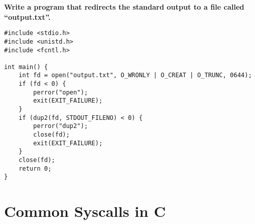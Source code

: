 \documentclass{article}
\begin{document}
\textbf{Write a program that redirects the standard output to a file called ``output.txt''.}

\begin{verbatim}
#include <stdio.h>
#include <unistd.h>
#include <fcntl.h>

int main() {
    int fd = open("output.txt", O_WRONLY | O_CREAT | O_TRUNC, 0644);
    if (fd < 0) {
        perror("open");
        exit(EXIT_FAILURE);
    }
    if (dup2(fd, STDOUT_FILENO) < 0) {
        perror("dup2");
        close(fd);
        exit(EXIT_FAILURE);
    }
    close(fd);
    return 0;
}
\end{verbatim}

\section*{Common Syscalls in C}
\end{document}
